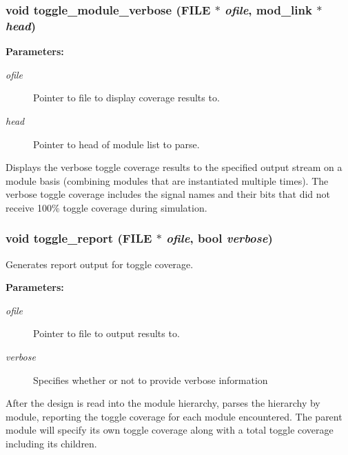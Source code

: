 \subsubsection{\setlength{\rightskip}{0pt plus 5cm}void toggle\_\-module\_\-verbose (FILE $\ast$ {\em ofile}, {\bf mod\_\-link} $\ast$ {\em head})}\label{toggle_8c_a9}


\begin{Desc}
\item[{\bf Parameters: }]\par
\begin{description}
\item[
{\em ofile}]Pointer to file to display coverage results to. \item[
{\em head}]Pointer to head of module list to parse.

\end{description}
\end{Desc}
Displays the verbose toggle coverage results to the specified output stream on a module basis (combining modules that are instantiated multiple times). The verbose toggle coverage includes the signal names and their bits that did not receive 100\% toggle coverage during simulation. 
\subsubsection{\setlength{\rightskip}{0pt plus 5cm}void toggle\_\-report (FILE $\ast$ {\em ofile}, {\bf bool} {\em verbose})}\label{toggle_8c_a10}


Generates report output for toggle coverage.

\begin{Desc}
\item[{\bf Parameters: }]\par
\begin{description}
\item[
{\em ofile}]Pointer to file to output results to. \item[
{\em verbose}]Specifies whether or not to provide verbose information

\end{description}
\end{Desc}
After the design is read into the module hierarchy, parses the hierarchy by module, reporting the toggle coverage for each module encountered. The parent module will specify its own toggle coverage along with a total toggle coverage including its  children. 

